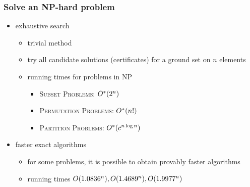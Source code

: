\begin{frame}
 \frametitle{Solve an NP-hard problem}

 \begin{itemize}
  \item exhaustive search
  \begin{itemize}
   \item trivial method
   \item try all candidate solutions (certificates) for a ground set on $n$ elements
   \item running times for problems in NP
  \begin{itemize}
   \item \textsc{Subset Problems}: $O^*(2^n)$
   \item \textsc{Permutation Problems}: $O^*(n!)$
   \item \textsc{Partition Problems}: $O^*(c^{n \log n})$
  \end{itemize}
  \end{itemize}
  \item faster exact algorithms
  \begin{itemize}
   \item for some problems, it is possible to obtain provably faster algorithms
   \item running times $O(1.0836^n), O(1.4689^n), O(1.9977^n)$
  \end{itemize}
 \end{itemize}
\end{frame}



%
% 
%
%

